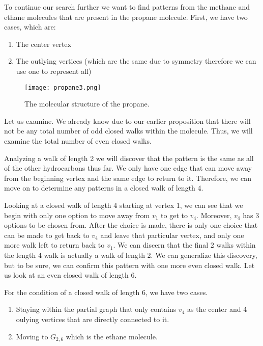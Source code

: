 \par To continue our search further we want to find patterns from the methane and ethane molecules that are present in the propane molecule. First, we have two cases, which are:
\begin{enumerate}
    \item The center vertex
    \item The outlying vertices (which are the same due to symmetry therefore we can use one to represent all)\\
\end{enumerate}
\begin{figure}
        \begin{center}
    \texttt{[image: propane3.png]}
    \end{center}
    \caption{\small{The molecular structure of the propane.}}
    \end{figure}
Let us examine. We already know due to our earlier proposition that there will not be any total number of odd closed walks within the molecule. Thus, we will examine the total number of even closed walks.

\par Analyzing a walk of length 2 we will discover that the pattern is the same as all of the other hydrocarbons thus far. We only have one edge that can move away from the beginning vertex and the same edge to return to it. Therefore, we can move on to determine any patterns in a closed walk of length 4.
\par Looking at a closed walk of length 4 starting at vertex 1, we can see that we begin with only one option to move away from $v_1$ to get to $v_4$.  Moreover, $v_4$ has 3 options to be chosen from. After the choice is made, there is only one choice that can be made to get back to $v_4$ and leave that particular vertex, and only one more walk left to return back to $v_1$. We can discern that the final 2 walks within the length 4 walk is actually a walk of length 2. We can generalize this discovery, but to be sure, we can confirm this pattern with one more even closed walk. Let us look at an even closed walk of length 6.

\par For the condition of a closed walk of length 6, we have two cases.
\begin{enumerate}
    \item Staying within the partial graph that only contains $v_4$ as the center and 4 oulying vertices that are directly connected to it.
    \item Moving to $G_{2,6}$ which is the ethane molecule.
\end{enumerate}

